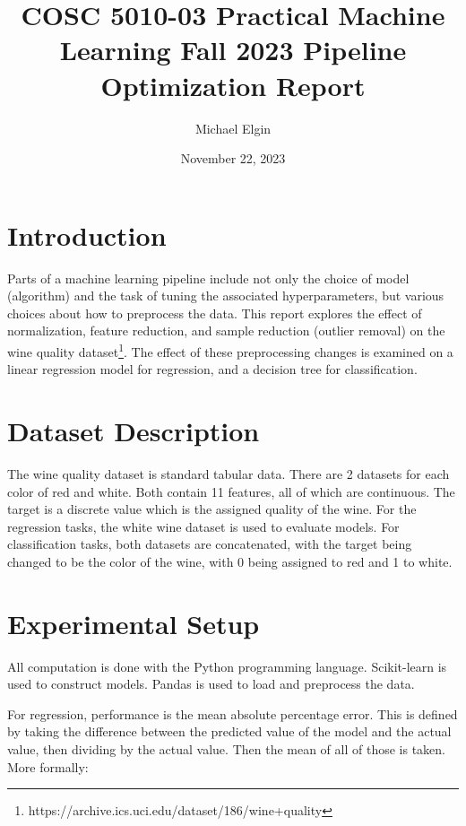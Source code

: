 \documentclass[12pt, letterpaper]{article}
\title{COSC 5010-03 Practical Machine Learning Fall 2023 Pipeline Optimization Report}
\author{Michael Elgin}
\date{November 22, 2023}
\begin{document}
\maketitle

\section{Introduction} %

Parts of a machine learning pipeline include not only the choice of model (algorithm) and the task of tuning the associated hyperparameters, but various choices about how to preprocess the data. This report explores the effect of normalization, feature reduction, and sample reduction (outlier removal) on the wine quality dataset\footnote{https://archive.ics.uci.edu/dataset/186/wine+quality}. The effect of these preprocessing changes is examined on a linear regression model for regression, and a decision tree for classification.

\section{Dataset Description} %

The wine quality dataset is standard tabular data. There are 2 datasets for each color of red and white. Both contain 11 features, all of which are continuous. The target is a discrete value which is the assigned quality of the wine. For the regression tasks, the white wine dataset is used to evaluate models. For classification tasks, both datasets are concatenated, with the target being changed to be the color of the wine, with 0 being assigned to red and 1 to white.

\section{Experimental Setup} %

All computation is done with the Python programming language. Scikit-learn is used to construct models. Pandas is used to load and preprocess the data.

For regression, performance is the mean absolute percentage error. This is defined by taking the difference between the predicted value of the model and the actual value, then dividing by the actual value. Then the mean of all of those is taken. More formally:
\end{document}

